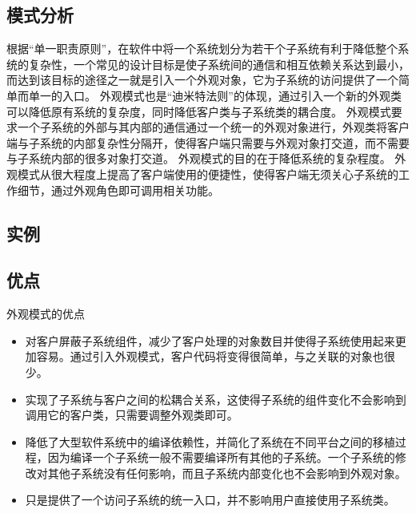 \documentclass[letterpaper,10pt,english]{sphinxmanual}
\begin{document}
\subsection{模式分析}
\label{\detokenize{structural_patterns/facade:id8}}
\sphinxAtStartPar
根据“单一职责原则”，在软件中将一个系统划分为若干个子系统有利于降低整个系统的复杂性，一个常见的设计目标是使子系统间的通信和相互依赖关系达到最小，而达到该目标的途径之一就是引入一个外观对象，它为子系统的访问提供了一个简单而单一的入口。
\sphinxhyphen{}外观模式也是“迪米特法则”的体现，通过引入一个新的外观类可以降低原有系统的复杂度，同时降低客户类与子系统类的耦合度。
\sphinxhyphen{} 外观模式要求一个子系统的外部与其内部的通信通过一个统一的外观对象进行，外观类将客户端与子系统的内部复杂性分隔开，使得客户端只需要与外观对象打交道，而不需要与子系统内部的很多对象打交道。
\sphinxhyphen{}外观模式的目的在于降低系统的复杂程度。
\sphinxhyphen{}外观模式从很大程度上提高了客户端使用的便捷性，使得客户端无须关心子系统的工作细节，通过外观角色即可调用相关功能。


\subsection{实例}
\label{\detokenize{structural_patterns/facade:id9}}

\subsection{优点}
\label{\detokenize{structural_patterns/facade:id10}}
\sphinxAtStartPar
外观模式的优点
\begin{itemize}
\item {} 
\sphinxAtStartPar
对客户屏蔽子系统组件，减少了客户处理的对象数目并使得子系统使用起来更加容易。通过引入外观模式，客户代码将变得很简单，与之关联的对象也很少。

\item {} 
\sphinxAtStartPar
实现了子系统与客户之间的松耦合关系，这使得子系统的组件变化不会影响到调用它的客户类，只需要调整外观类即可。

\item {} 
\sphinxAtStartPar
降低了大型软件系统中的编译依赖性，并简化了系统在不同平台之间的移植过程，因为编译一个子系统一般不需要编译所有其他的子系统。一个子系统的修改对其他子系统没有任何影响，而且子系统内部变化也不会影响到外观对象。

\item {} 
\sphinxAtStartPar
只是提供了一个访问子系统的统一入口，并不影响用户直接使用子系统类。

\end{itemize}
\end{document}
